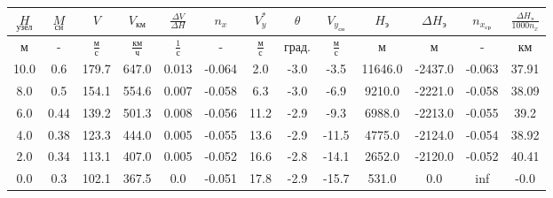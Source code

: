 \begin{tabular}{|c|c|c|c|c|c|c|c|c|c|c|c|c|}
\hline
$\underset{узел}{H}$ & $\underset{сн}{M}$ & $V$ & $V_{км}$ & $\frac{\Delta V}{\Delta H}$ & $n_x$ & $V_{y}^*$ & $\theta$ & $V_{y_{сн}}$ & $H_э$ & $\Delta H_э$ & $n_{x_{ср}}$ & $\frac{\Delta H_{э}}{1000 n_x}$ \\ 
\hline
м & - & $\frac{м}{с}$ & $\frac{км}{ч}$ & $\frac{1}{с}$ & - & $\frac{м}{с}$ & $град.$ & $\frac{м}{с}$ & м & м & - & км \\ 
\hline
10.0 & 0.6 & 179.7 & 647.0 & 0.013 & -0.064 & 2.0 & -3.0 & -3.5 & 11646.0 & -2437.0 & -0.063 & 37.91 \\ 
\hline
8.0 & 0.5 & 154.1 & 554.6 & 0.007 & -0.058 & 6.3 & -3.0 & -6.9 & 9210.0 & -2221.0 & -0.058 & 38.09 \\ 
\hline
6.0 & 0.44 & 139.2 & 501.3 & 0.008 & -0.056 & 11.2 & -2.9 & -9.3 & 6988.0 & -2213.0 & -0.055 & 39.2 \\ 
\hline
4.0 & 0.38 & 123.3 & 444.0 & 0.005 & -0.055 & 13.6 & -2.9 & -11.5 & 4775.0 & -2124.0 & -0.054 & 38.92 \\ 
\hline
2.0 & 0.34 & 113.1 & 407.0 & 0.005 & -0.052 & 16.6 & -2.8 & -14.1 & 2652.0 & -2120.0 & -0.052 & 40.41 \\ 
\hline
0.0 & 0.3 & 102.1 & 367.5 & 0.0 & -0.051 & 17.8 & -2.9 & -15.7 & 531.0 & 0.0 & inf & -0.0 \\ 
\hline
\end{tabular}